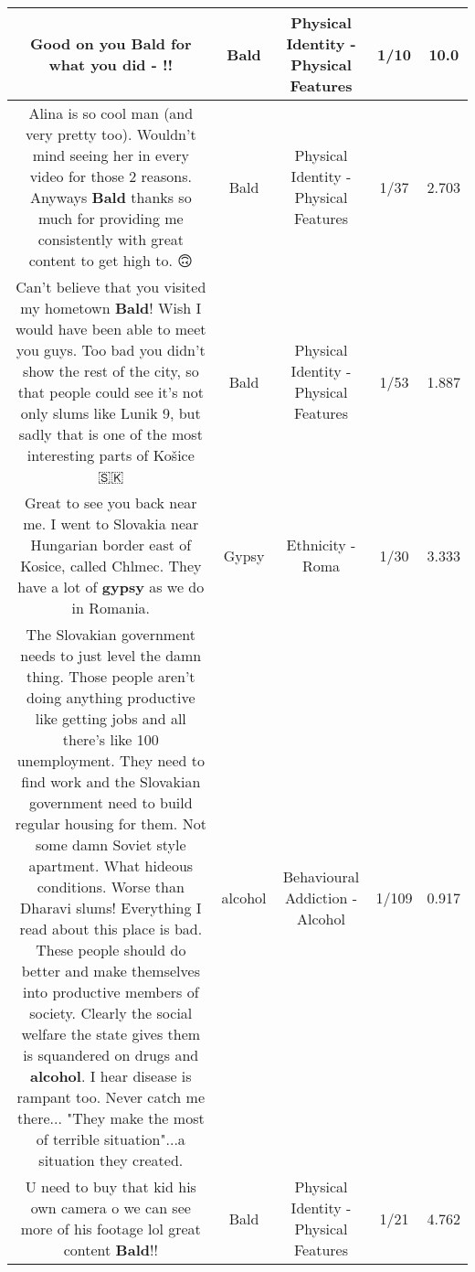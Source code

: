 \documentclass[11pt]{article}
\newlength\mylength
\begin{document}
\begin{center}
\begin{longtable}{|C{.65\mylength}|C{.30\mylength}|C{.12\mylength}|C{.12\mylength}|C{.12\mylength}|}
  \small Good on you \textbf{Bald} for what you did - !!\normalsize   & Bald & Physical Identity - Physical Features & 1/10 & 10.0 \\  \hline
  \small Alina is so cool man (and very pretty too). Wouldn't mind seeing her in every video for those 2 reasons. Anyways \textbf{Bald} thanks so much for providing me consistently with great content to get high to. 🙃\normalsize   & Bald & Physical Identity - Physical Features & 1/37 & 2.703 \\  \hline
  \small Can't believe that you visited my hometown \textbf{Bald}! Wish I would have been able to meet you guys. Too bad you didn't show the rest of the city, so that people could see it's not only slums like Lunik 9, but sadly that is one of the most interesting parts of Košice 🇸🇰\normalsize   & Bald & Physical Identity - Physical Features & 1/53 & 1.887 \\  \hline
  \small Great to see you back near me. I went to Slovakia near Hungarian border east of Kosice, called Chlmec. They have a lot of \textbf{gypsy} as we do in Romania.\normalsize   & Gypsy & Ethnicity - Roma & 1/30 & 3.333 \\  \hline
  \small The Slovakian government needs to just level the damn thing. Those people aren't doing anything productive like getting jobs and all there's like 100 unemployment.  They need to find work and the Slovakian government need to build regular housing for them. Not some damn Soviet style apartment. What hideous conditions. Worse than Dharavi slums! Everything I read about this place is bad. These people should do better and make themselves into productive members of society. Clearly the social welfare the state gives them is squandered on drugs and \textbf{alcohol}. I hear disease is rampant too. Never catch me there...  "They make the most of terrible situation"...a situation they created.\normalsize   & alcohol & Behavioural Addiction - Alcohol & 1/109 & 0.917 \\  \hline
  \small U need to buy that kid his own camera o we can see more of his footage lol great content \textbf{Bald}!!\normalsize   & Bald & Physical Identity - Physical Features & 1/21 & 4.762 \\  \hline

\end{longtable}
\end{center}
\end{document}
